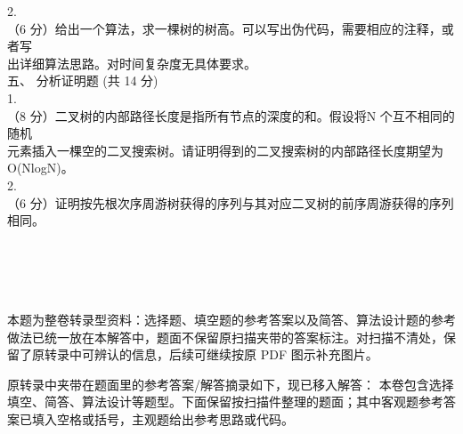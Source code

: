 \begin{question}
2.\\
（6 分）给出一个算法，求一棵树的树高。可以写出伪代码，需要相应的注释，或者写\\
出详细算法思路。对时间复杂度无具体要求。\\
五、 分析证明题 (共 14 分)\\
1.\\
（8 分）二叉树的内部路径长度是指所有节点的深度的和。假设将N 个互不相同的随机\\
元素插入一棵空的二叉搜索树。请证明得到的二叉搜索树的内部路径长度期望为\\
O(NlogN)。\\
2.\\
（6 分）证明按先根次序周游树获得的序列与其对应二叉树的前序周游获得的序列相同。\\
\\
\\
\\
\

\begin{solution}
本题为整卷转录型资料：选择题、填空题的参考答案以及简答、算法设计题的参考做法已统一放在本解答中，题面不保留原扫描夹带的答案标注。对扫描不清处，保留了原转录中可辨认的信息，后续可继续按原 PDF 图示补充图片。

\medskip
\noindent 原转录中夹带在题面里的参考答案/解答摘录如下，现已移入解答：
本卷包含选择填空、简答、算法设计等题型。下面保留按扫描件整理的题面；其中客观题参考答案已填入空格或括号，主观题给出参考思路或代码。


\end{solution}
\end{question}
